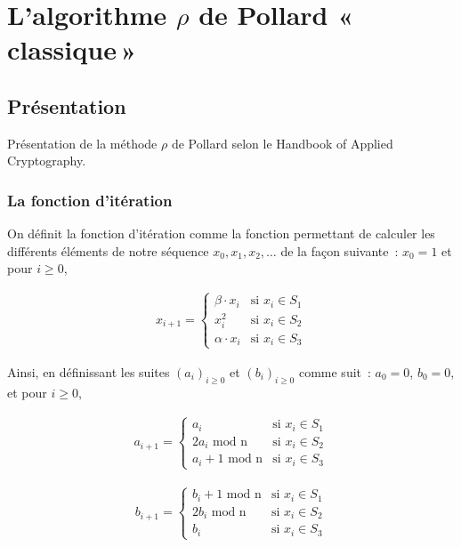 \chapter{L'algorithme \texorpdfstring{$\rho$}{Rho} de Pollard «\texorpdfstring{\,}{\ }classique\texorpdfstring{\,}{\ }»}
    \section{Présentation}
    Présentation de la méthode $\rho$ de Pollard selon le Handbook of Applied Cryptography\autocite[106]{handbook}.

        \subsection{La fonction d'itération}
        On définit la fonction d'itération comme la fonction permettant de calculer les différents éléments de notre séquence $x_0, x_1, x_2, \ldots$ de la façon suivante~: $x_0 = 1$ et pour $i \geq 0$,

        \begin{align*}
          x_{i+1} =
          \begin{cases}
            \beta \cdot x_i & \text{si } x_i \in S_1 \\
            x_i^2 & \text{si } x_i \in S_2 \\
            \alpha \cdot x_i & \text{si } x_i \in S_3
          \end{cases}
        \end{align*}

        Ainsi, en définissant les suites ${(a_i)}_{i \geq 0}$ et ${(b_i)}_{i \geq 0}$ comme suit~: $a_0 = 0$, $b_0 = 0$, et pour $i \geq 0$,

        \begin{align*}
          a_{i+1} =
          \begin{cases}
            a_i                   & \text{si } x_i \in S_1 \\
            2a_i \text{\ mod n}    & \text{si } x_i \in S_2 \\
            a_i + 1 \text{\ mod n} & \text{si } x_i \in S_3
          \end{cases}
        \end{align*}

        \begin{align*}
          b_{i+1} =
          \begin{cases}
            b_i + 1 \text{\ mod n} & \text{si } x_i \in S_1 \\
            2b_i \text{\ mod n}    & \text{si } x_i \in S_2 \\
            b_i                   & \text{si } x_i \in S_3
          \end{cases}
        \end{align*}


